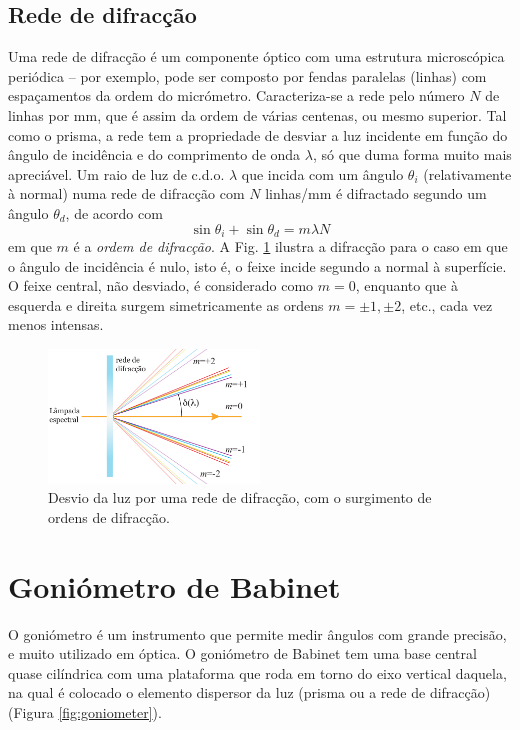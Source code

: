 \documentclass[12pt,a4paper,oneside]{paper}
\begin{document}
\subsection{\sf Rede de difracção}
Uma rede de difracção é um componente óptico com uma estrutura microscópica periódica – por exemplo, pode ser composto por
fendas paralelas (linhas) com espaçamentos da ordem do micrómetro. Caracteriza-se a rede pelo número $N$ de linhas por mm,
que é assim da ordem de várias centenas, ou mesmo superior. Tal como o prisma, a rede tem a propriedade de desviar a luz
incidente em função do ângulo de incidência e do comprimento de onda $\lambda$, só que duma forma muito mais apreciável.
Um raio de luz de c.d.o. $\lambda$ que incida com um ângulo $\theta_i$ (relativamente à normal) numa rede de difracção com
$N$ linhas/mm é difractado segundo um ângulo $\theta_d$, de acordo com
\begin{equation}
\sin \theta_i+\sin\theta_d=m \lambda N
\end{equation}
em que $m$ é a \emph{ordem de difracção}. A Fig. \ref{fig:rede1} ilustra a difracção para o caso em que o ângulo de incidência
é nulo, isto é, o feixe incide segundo a normal à superfície. O feixe central, não desviado, é considerado como $m=0$, enquanto
que à esquerda e direita surgem simetricamente as ordens $m=\pm 1, \pm 2$, etc., cada vez menos intensas.

\begin{figure}[!t]  
\centering 
	\includegraphics[width=0.5\textwidth]{./planck_images/rede1}
	\caption{Desvio da luz por uma rede de difracção, com o surgimento de ordens de difracção. \label{fig:rede1}} 
\end{figure}


\section{\sf Goniómetro de Babinet}
O goniómetro é um instrumento que permite medir ângulos com grande precisão, e muito utilizado em óptica. O goniómetro de
Babinet tem uma base central quase cilíndrica com uma plataforma que roda em torno do eixo vertical daquela, na qual é colocado
o elemento dispersor da luz (prisma ou a rede de difracção) (Figura \ref{fig:goniometer}). 
\end{document}
